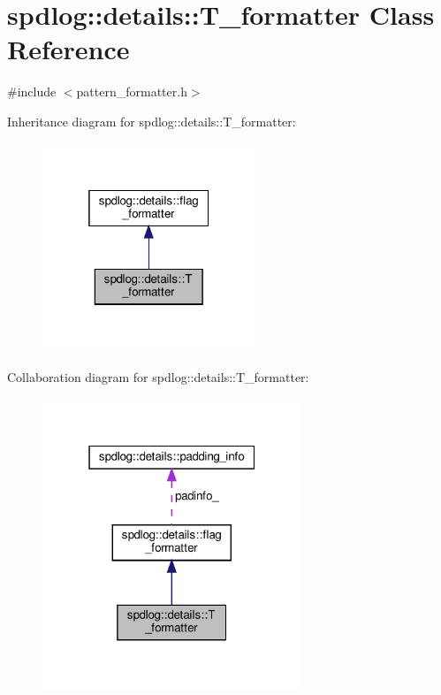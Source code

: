 \hypertarget{classspdlog_1_1details_1_1_t__formatter}{}\section{spdlog\+:\+:details\+:\+:T\+\_\+formatter Class Reference}
\label{classspdlog_1_1details_1_1_t__formatter}


{\ttfamily \#include $<$pattern\+\_\+formatter.\+h$>$}



Inheritance diagram for spdlog\+:\+:details\+:\+:T\+\_\+formatter\+:
\nopagebreak
\begin{figure}[H]
\begin{center}
\leavevmode
\includegraphics[width=181pt]{classspdlog_1_1details_1_1_t__formatter__inherit__graph}
\end{center}
\end{figure}


Collaboration diagram for spdlog\+:\+:details\+:\+:T\+\_\+formatter\+:
\nopagebreak
\begin{figure}[H]
\begin{center}
\leavevmode
\includegraphics[width=220pt]{classspdlog_1_1details_1_1_t__formatter__coll__graph}
\end{center}
\end{figure}
